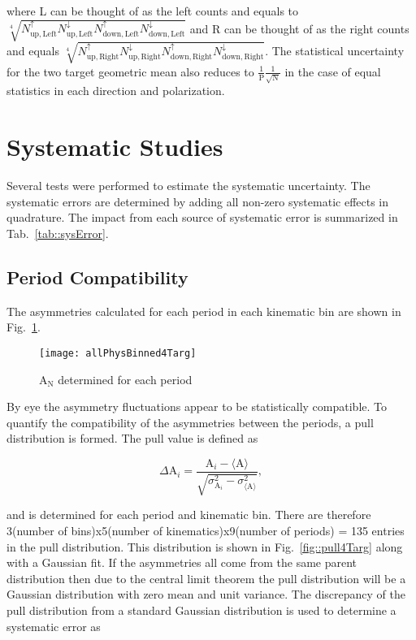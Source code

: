 \noindent
where L can be thought of as the left counts and equals to
$\sqrt[4]{N_{\mathrm{up,Left}}^{\uparrow}N_{\mathrm{up,
      Left}}^{\downarrow}N_{\mathrm{down,Left}}^{\uparrow}N_{\mathrm{down,
      Left}}^{\downarrow}}$ and R can be thought of as the right counts and
equals $\sqrt[4]{N_{\mathrm{up,Right}}^{\uparrow}N_{\mathrm{up,
      Right}}^{\downarrow}N_{\mathrm{down,Right}}^{\uparrow}N_{\mathrm{down,
      Right}}^{\downarrow}}$.  The statistical uncertainty for the two target
geometric mean also reduces to $\frac{1}{\mathrm{P}}\frac{1}{\sqrt{\mathrm{N}}}$
in the case of equal statistics in each direction and polarization.


\section{Systematic Studies} \label{sec::systematics}
Several tests were performed to estimate the systematic uncertainty.  The
systematic errors are determined by adding all non-zero systematic effects in
quadrature.  The impact from each source of systematic error is summarized in
Tab.~\ref{tab::sysError}.

\subsection{Period Compatibility}
The asymmetries calculated for each period in each kinematic bin are shown in
Fig.~\ref{fig::allPhysBinned4Targ}.

\begin{figure}[h!t]
  \begin{center}
    \texttt{[image: allPhysBinned4Targ]}
    \caption{A$_{\mathrm{N}}$ determined for each period}
    \label{fig::allPhysBinned4Targ}
  \end{center}
\end{figure}

\noindent
By eye the asymmetry fluctuations appear to be statistically compatible.  To
quantify the compatibility of the asymmetries between the periods, a pull
distribution is formed.  The pull value is defined as

\begin{equation}
  \label{eq::pull}
  \Delta\mathrm{A}_i =
  \frac{
    \mathrm{A}_i - \langle \mathrm{A} \rangle
  }{
    \sqrt{
      \sigma^2_{\mathrm{A}_i} - \sigma^2_{\langle \mathrm{A} \rangle}
    }
  },
\end{equation}

\noindent
and is determined for each period and kinematic bin.  There are therefore
3(number of bins)x5(number of kinematics)x9(number of periods) = 135 entries in
the pull distribution. This distribution is shown in Fig.~\ref{fig::pull4Targ}
along with a Gaussian fit.  If the asymmetries all come from the same parent
distribution then due to the central limit theorem the pull distribution will be
a Gaussian distribution with zero mean and unit variance.  The discrepancy of
the pull distribution from a standard Gaussian distribution is used to determine
a systematic error as

